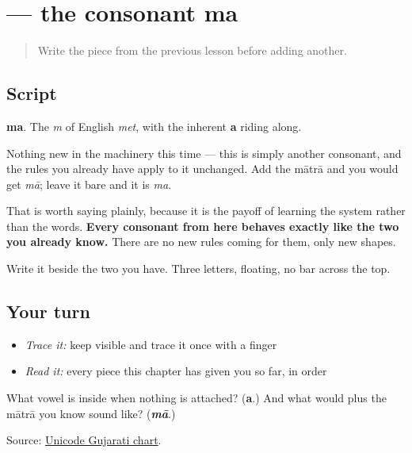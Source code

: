 \section[ma]{ — the consonant ma}

\label{lesson:GU-W01-ma}



\begin{quote}
Write the piece from the previous lesson before adding another.
\end{quote}

\subsection*{Script}
\begin{quote}
\end{quote}

\textbf{ma}. The \emph{m} of English \emph{met}, with the inherent \textbf{a} riding along.

Nothing new in the machinery this time — this is simply another consonant, and the rules you already have apply to it unchanged. Add the mātrā and you would get \emph{mā}; leave it bare and it is \emph{ma}.

That is worth saying plainly, because it is the payoff of learning the system rather than the words. \textbf{Every consonant from here behaves exactly like the two you already know.} There are no new rules coming for them, only new shapes.

Write it beside the two you have. Three letters, floating, no bar across the top.

\subsection*{Your turn}
\begin{itemize}
\raggedright
  \item \emph{Trace it:} keep  visible and trace it once with a finger
  \item \emph{Read it:} every piece this chapter has given you so far, in order
\end{itemize}

\begin{tcolorbox}[breakable,colback=teal!4,colframe=teal!35!black,title={Before you move on}]
What vowel is inside \textbf{} when nothing is attached? (\textbf{a}.) And what would \textbf{} plus the mātrā you know sound like? (\emph{\textbf{mā}}.)

Source: \href{https://www.unicode.org/charts/PDF/U0A80.pdf}{Unicode Gujarati chart}.
\end{tcolorbox}
